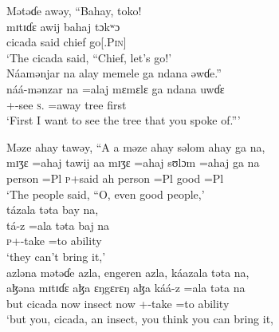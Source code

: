 \ea  Mətəɗe  awəy, “Bahay,  toko! \\
\gll mɪtɪɗɛ   awij   bahaj  tɔkʷɔ\\
 cicada  said  chief   {go[{\IMP}.\textsc{Pin}}] \\
 \glt ‘The cicada said, “Chief, let’s go!’  \\
 
 \medskip
 Náamənjar  na  alay  memele  ga  ndana  əwɗe.”\\
 \gll náá{}-mənzar   na  =alaj   mɛmɛlɛ ga   ndana  uwɗɛ\\
 {\oneS}+{\POT}-see   \textsc{s}.{\DO}  =away   tree   {\ADJ}  {\DEM}   first\\
\glt ‘First I want to see the tree that you spoke of.”’
 \z
 
\ea  Məze  ahay  tawəy,  “A a  məze  ahay  səlom  ahay  ga  na,  \\
 \gll mɪʒɛ  =ahaj  tawij   aa mɪʒɛ  =ahaj   sʊlɔm   =ahaj   ga   na\\
 person  =Pl  \textsc{p}+said  ah  person   =Pl     good    =Pl   {\ADJ}   {\PSP}\\
 \glt ‘The people said, “O, even good people,’\\
 
 \medskip
 tázala  təta  bay  na,  \\
\gll  tá-z     =ala     təta baj         na \\
 \textsc{p}+{\IFV}-take  =to  ability  {\NEG}   {\PSP}\\
 \glt ‘they can’t bring it,’  \\
 
 \medskip
 azləna  mətəɗe  azla,  engeren  azla,   káazala  təta  na, \\
 \gll aɮəna  mɪtɪɗɛ    aɮa   ɛŋgɛrɛŋ   aɮa káá-z    =ala təta          na\\
 but    cicada    now      insect     now   {\twoS}+{\POT}-take  =to    ability   {\PSP}\\
 \glt ‘but you, cicada, an insect, you think you can bring it,\\
 
